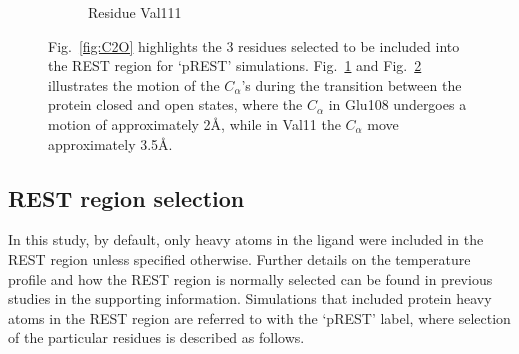 \begin{figure}[H]
\begin{subfigure}{.45\textwidth}
   \label{fig:Glu108-C2O}
\end{subfigure}\hfill
\begin{subfigure}{.55\textwidth}
   \centering
   \caption{Residue Val111}
   \label{fig:Val111-C2O}
\end{subfigure}\hfill
\caption{Fig.~\ref{fig:C2O} highlights the 3 residues selected to be included into the REST region for `pREST' simulations.
Fig.~\ref{fig:Glu108-C2O} and Fig.~\ref{fig:Val111-C2O} illustrates the motion of the $C_{\alpha}$'s during the transition between the protein closed and open states, where the $C_{\alpha}$ in Glu108 undergoes a motion of approximately 2\AA, while in Val11 the $C_{\alpha}$ move approximately 3.5\AA.}
\label{fig:pRESTresidues}
\end{figure}

\subsection{REST region selection}
In this study, by default, only heavy atoms in the ligand were included in the REST region unless specified otherwise.
Further details on the temperature profile and how the REST region is normally selected can be found in previous studies\cite{FEP/REST,FEPplus} in the supporting information.
Simulations that included protein heavy atoms in the REST region are referred to with the `pREST' label, where selection of the particular residues is described as follows.

